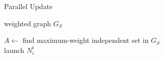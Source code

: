 \begin{multicols}{2}
% 



\begin{algorithm*}[b] %
\setlength{\algowidth}{100mm}
 \setlength{\hsize}{\algowidth}
 \caption{Parallel Update}
 \label{alg:parallel_update}
 \small
 
 {weighted graph $G_S$} 
 
 \BlankLine
 
 {
 $A \leftarrow$ find maximum-weight independent set in $G_S$ \\
 
 \BlankLine 
 { 
 launch $N^t_i$ \\
 }
 }
 
 \vspace*{6pt}
 
\end{algorithm*}


\end{multicols}

